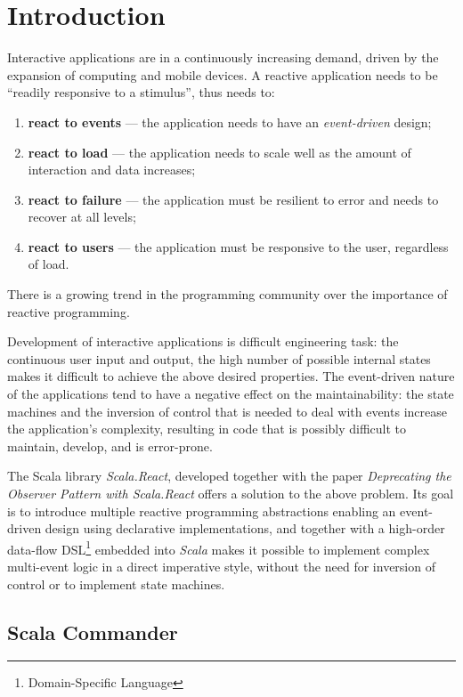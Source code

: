 
\chapter{Introduction}\label{chap:intro}

Interactive applications are in a continuously increasing demand, driven by the expansion of computing and mobile devices. A reactive application needs to be ``readily responsive to a stimulus'', thus needs to:
\begin{enumerate}
\item \textbf{react to events} --- the application needs to have an \emph{event-driven} design;
\item \textbf{react to load} --- the application needs to scale well as the amount of interaction and data increases;
\item \textbf{react to failure} --- the application must be resilient to error and needs to recover at all levels;
\item \textbf{react to users} --- the application must be responsive to the user, regardless of load.
\end{enumerate}
There is a growing trend in the programming community over the importance of reactive programming. \cite{ReactiveManifesto}

Development of interactive applications is difficult engineering task: the continuous user input and output, the high number of possible internal states makes it difficult to achieve the above desired properties. The event-driven nature of the applications tend to have a negative effect on the maintainability: the state machines and the inversion of control that is needed to deal with events increase the application's complexity, resulting in code that is possibly difficult to maintain, develop, and is error-prone. 

The Scala library \emph{Scala.React}, developed together with the paper \emph{Deprecating the Observer Pattern with Scala.React} offers a solution to the above problem. Its goal is to introduce multiple reactive programming abstractions enabling an event-driven design using declarative implementations, and together with a high-order data-flow DSL\footnote{Domain-Specific Language} embedded into \emph{Scala} makes it possible to implement complex multi-event logic in a direct imperative style, without the need for inversion of control or to implement state machines. \cite{DeprecatingObservers}

\section{Scala Commander}

